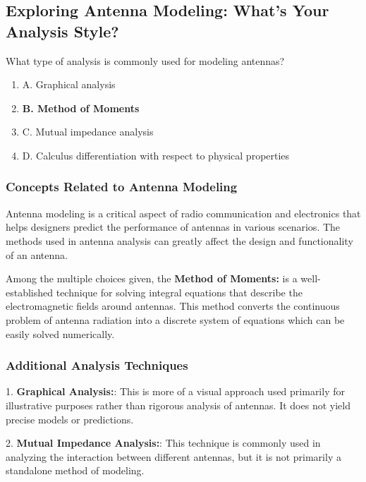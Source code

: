 \subsection{Exploring Antenna Modeling: What's Your Analysis Style?}

\begin{tcolorbox}[colback=gray!10, colframe=black, title=E9B09] What type of analysis is commonly used for modeling antennas?
\begin{enumerate}
    \item A. Graphical analysis
    \item \textbf{B. Method of Moments}
    \item C. Mutual impedance analysis
    \item D. Calculus differentiation with respect to physical properties
\end{enumerate} \end{tcolorbox}

\subsubsection{Concepts Related to Antenna Modeling}

Antenna modeling is a critical aspect of radio communication and electronics that helps designers predict the performance of antennas in various scenarios. The methods used in antenna analysis can greatly affect the design and functionality of an antenna. 

Among the multiple choices given, the \textbf{Method of Moments:} is a well-established technique for solving integral equations that describe the electromagnetic fields around antennas. This method converts the continuous problem of antenna radiation into a discrete system of equations which can be easily solved numerically. 

\subsubsection{Additional Analysis Techniques}

1. \textbf{Graphical Analysis:}: This is more of a visual approach used primarily for illustrative purposes rather than rigorous analysis of antennas. It does not yield precise models or predictions.

2. \textbf{Mutual Impedance Analysis:}: This technique is commonly used in analyzing the interaction between different antennas, but it is not primarily a standalone method of modeling.

